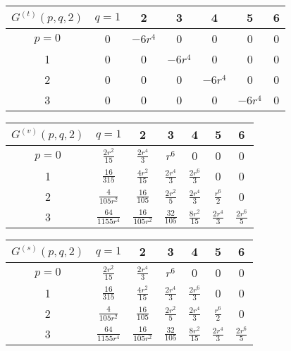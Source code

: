 \documentclass[a4paper,aps,preprint,groupedaddress,showpacs]{revtex4}
\begin{document}
\vspace{40pt}
\begin{tabular}{c|cccccc}
\hline\hline
$G^{(t)}(p,q,2)$ & $q=1$ & 2 & 3 & 4 & 5 & 6 \\
\hline
$p=0$ & 0 & $-6r^{4}$ & 0 & 0 & 0 & 0 \\
1 & 0 & 0 & $-6r^{4}$ & 0 & 0 & 0 \\
2 & 0 & 0 & 0 & $-6r^{4}$ & 0 & 0 \\
3 & 0 & 0 & 0 & 0 & $-6r^{4}$ & 0 \\ 
\hline\hline
\end{tabular}

\vspace{40pt}
\begin{tabular}{c|cccccc}
\hline\hline
$G^{(v)}(p,q,2)$ & $q=1$ & 2 & 3 & 4 & 5 & 6 \\
\hline
$p=0$ & $\frac{2r^{2}}{15}$ & $\frac{2r^{4}}{3}$ & $r^{6}$ 
& 0 & 0 & 0 \\
1 & $\frac{16}{315}$ & $\frac{4r^{2}}{15}$ & $\frac{2r^{4}}{3}$ 
& $\frac{2r^{6}}{3}$ & 0 & 0 \\
2 & $\frac{4}{105r^{2}}$ & $\frac{16}{105}$ & $\frac{2r^{2}}{5}$ 
& $\frac{2r^{4}}{3}$ & $\frac{r^{6}}{2}$ & 0 \\
3 & $\frac{64}{1155r^{4}}$ & $\frac{16}{105r^{2}}$  
& $\frac{32}{105}$ & $\frac{8r^{2}}{15}$ 
& $\frac{2r^{4}}{3}$ 
& $\frac{2r^{6}}{5}$ \\ 
\hline\hline
\end{tabular}

\vspace{40pt}
\begin{tabular}{c|cccccc}
\hline\hline
$G^{(s)}(p,q,2)$ & $q=1$ & 2 & 3 & 4 & 5 & 6 \\
\hline
$p=0$ & $\frac{2r^{2}}{15}$ & $\frac{2r^{4}}{3}$ & $r^{6}$ 
& 0 & 0 & 0 \\
1 & $\frac{16}{315}$ & $\frac{4r^{2}}{15}$ & $\frac{2r^{4}}{3}$ 
& $\frac{2r^{6}}{3}$ & 0 & 0 \\
2 & $\frac{4}{105r^{2}}$ & $\frac{16}{105}$ & $\frac{2r^{2}}{5}$ 
& $\frac{2r^{4}}{3}$ & $\frac{r^{6}}{2}$ & 0 \\
3 & $\frac{64}{1155r^{4}}$ & $\frac{16}{105r^{2}}$  
& $\frac{32}{105}$ & $\frac{8r^{2}}{15}$ 
& $\frac{2r^{4}}{3}$ 
& $\frac{2r^{6}}{5}$ \\ 
\hline\hline
\end{tabular}
\end{document}
